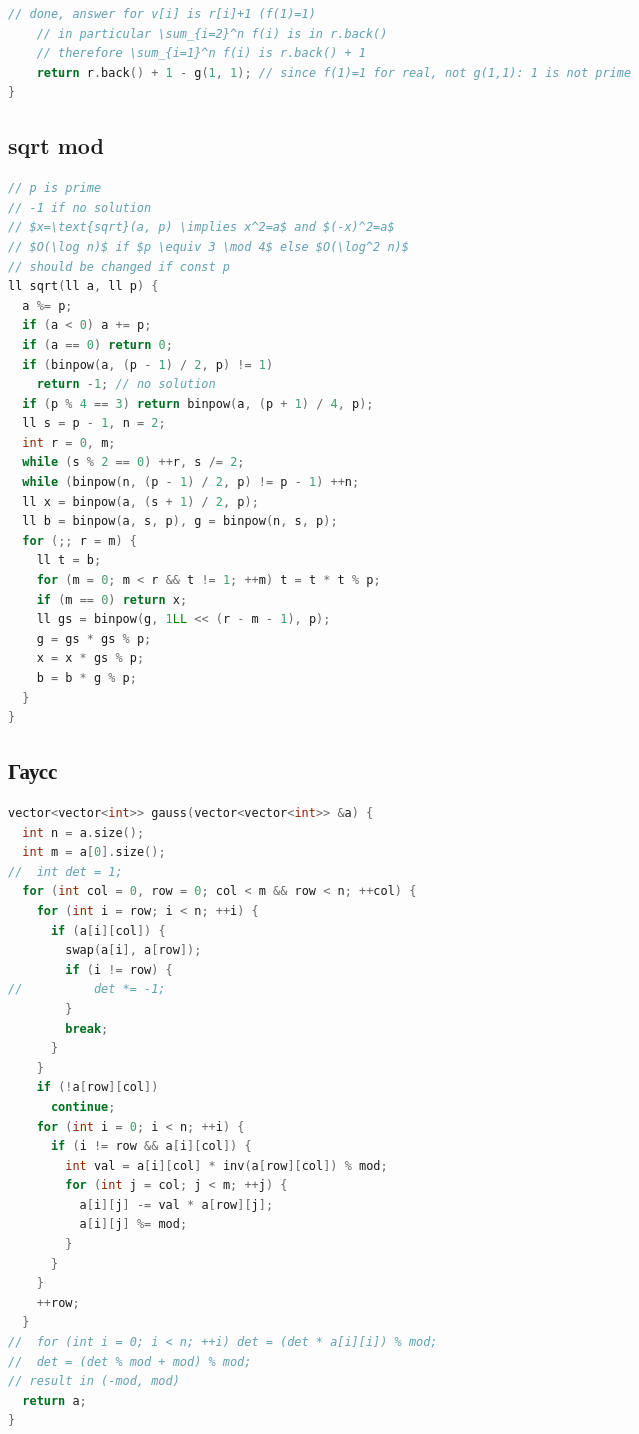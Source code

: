 \documentclass[9pt,a4paper,landscape,twosided]{extarticle}
\begin{document}
\begin{multicols*}{3}
\begin{lstlisting}[language=C++]
    // done, answer for v[i] is r[i]+1 (f(1)=1)
    // in particular \sum_{i=2}^n f(i) is in r.back()
    // therefore \sum_{i=1}^n f(i) is r.back() + 1
    return r.back() + 1 - g(1, 1); // since f(1)=1 for real, not g(1,1): 1 is not prime
}
\end{lstlisting}

\subsection{sqrt mod}
\begin{lstlisting}[language=C++]
// p is prime
// -1 if no solution
// $x=\text{sqrt}(a, p) \implies x^2=a$ and $(-x)^2=a$
// $O(\log n)$ if $p \equiv 3 \mod 4$ else $O(\log^2 n)$
// should be changed if const p
ll sqrt(ll a, ll p) {
  a %= p;
  if (a < 0) a += p;
  if (a == 0) return 0;
  if (binpow(a, (p - 1) / 2, p) != 1)
    return -1; // no solution
  if (p % 4 == 3) return binpow(a, (p + 1) / 4, p);
  ll s = p - 1, n = 2;
  int r = 0, m;
  while (s % 2 == 0) ++r, s /= 2;
  while (binpow(n, (p - 1) / 2, p) != p - 1) ++n;
  ll x = binpow(a, (s + 1) / 2, p);
  ll b = binpow(a, s, p), g = binpow(n, s, p);
  for (;; r = m) {
    ll t = b;
    for (m = 0; m < r && t != 1; ++m) t = t * t % p;
    if (m == 0) return x;
    ll gs = binpow(g, 1LL << (r - m - 1), p);
    g = gs * gs % p;
    x = x * gs % p;
    b = b * g % p;
  }
}

\end{lstlisting}

\subsection{Гаусс}
\begin{lstlisting}[language=C++]
vector<vector<int>> gauss(vector<vector<int>> &a) {
  int n = a.size();
  int m = a[0].size();
//  int det = 1;
  for (int col = 0, row = 0; col < m && row < n; ++col) {
    for (int i = row; i < n; ++i) {
      if (a[i][col]) {
        swap(a[i], a[row]);
        if (i != row) {
//          det *= -1;
        }
        break;
      }
    }
    if (!a[row][col])
      continue;
    for (int i = 0; i < n; ++i) {
      if (i != row && a[i][col]) {
        int val = a[i][col] * inv(a[row][col]) % mod;
        for (int j = col; j < m; ++j) {
          a[i][j] -= val * a[row][j];
          a[i][j] %= mod;
        }
      }
    }
    ++row;
  }
//  for (int i = 0; i < n; ++i) det = (det * a[i][i]) % mod;
//  det = (det % mod + mod) % mod;
// result in (-mod, mod)
  return a;
}


\end{lstlisting}
\end{multicols*}
\end{document}
